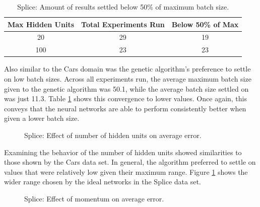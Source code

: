 \documentclass[10pt, conference, compsocconf]{IEEEtran}
\begin{document}
\begin{table}
\caption{Splice: Amount of results settled below 50\% of maximum batch size.}
\label{tbl:SpliceBatchSize}
\centering
\begin{tabular}{c c c}
\hline
Max Hidden Units & Total Experiments Run & Below 50\% of Max \\
\hline
20 & 29 & 19 \\
100 & 23 & 23 \\
\hline
\end{tabular}
\end{table}

Also similar to the Cars domain was the genetic algorithm's preference to settle on low batch sizes. Across all experiments run, the average maximum batch size given to the genetic algorithm was 50.1, while the average batch size settled on was just 11.3. Table \ref{tbl:SpliceBatchSize} shows this convergence to lower values. Once again, this conveys that the neural networks are able to perform consistently better when given a lower batch size.

\begin{figure}
\begin{center}
\end{center}
\caption{Splice: Effect of number of hidden units on average error.}
\label{fig:SpliceNumHidden}
\end{figure}

Examining the behavior of the number of hidden units showed similarities to those shown by the Cars data set. In general, the algorithm preferred to settle on values that were relatively low given their maximum range. Figure \ref{fig:SpliceNumHidden} shows the wider range chosen by the ideal networks in the Splice data set.

\begin{figure}
\begin{center}
\end{center}
\caption{Splice: Effect of momentum on average error.}
\label{fig:SpliceMomentum}
\end{figure}
\end{document}
